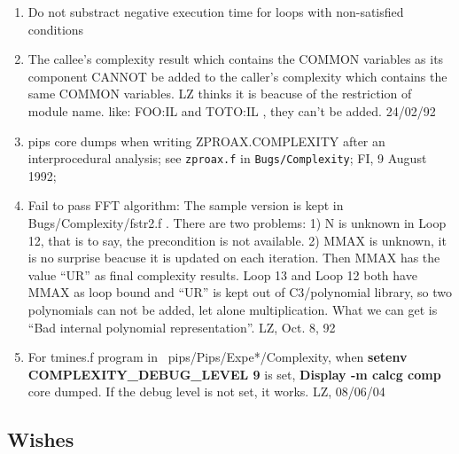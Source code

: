 \begin{enumerate}

  \item Do not substract negative execution time for loops with
	non-satisfied conditions

  \item The callee's complexity result which contains the COMMON
	variables as its component CANNOT be added to the caller's
	complexity which contains the same COMMON variables.
	LZ thinks it is beacuse of the restriction of module name.
	like: FOO:IL and TOTO:IL , they can't be added. 24/02/92

  \item pips core dumps when writing ZPROAX.COMPLEXITY after an
	interprocedural analysis;
	see \verb+zproax.f+ in \verb+Bugs/Complexity+;
	FI, 9 August 1992;

  \item Fail to pass FFT algorithm:
	The sample version is kept in Bugs/Complexity/fstr2.f .
	There are two problems: 1) N is unknown in Loop 12, that is to
	say, the precondition is not available.
	2) MMAX is unknown, it is no surprise beacuse it is updated
	on each iteration. Then MMAX has the value ``UR'' as final
	complexity results. Loop 13 and Loop 12 both have MMAX as 
	loop bound and ``UR'' is kept out of C3/polynomial library,
	so two polynomials can not be added, let alone multiplication.
	What we can get is ``Bad internal polynomial representation''.
	LZ, Oct. 8, 92

  \item For tmines.f program in ~pips/Pips/Expe*/Complexity,
	when {\bf setenv COMPLEXITY_DEBUG_LEVEL 9} is set,
	{\bf Display -m calcg comp} core dumped.
	If the debug level is not set, it works.
	LZ, 08/06/04

\end{enumerate}

\subsection{Wishes}


